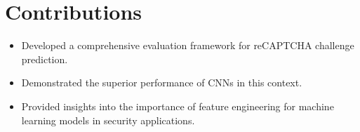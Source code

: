 \documentclass{article}
\begin{document}
\section{Contributions}
\begin{itemize}
    \item Developed a comprehensive evaluation framework for reCAPTCHA challenge prediction.
    \item Demonstrated the superior performance of CNNs in this context.
    \item Provided insights into the importance of feature engineering for machine learning models in security applications.
\end{itemize}



\end{document}

